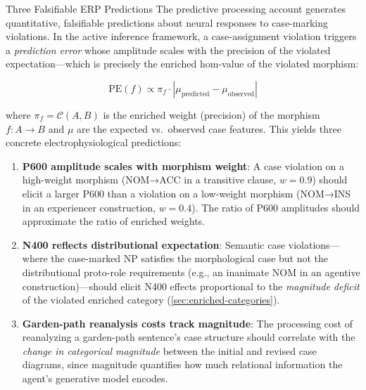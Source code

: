 \documentclass[
  ignorenonframetext,
]{beamer}
\begin{document}
\begin{frame}{Three Falsifiable ERP Predictions}
\protect{}\label{three-falsifiable-erp-predictions}
The predictive processing account generates quantitative, falsifiable
predictions about neural responses to case-marking violations. In the
active inference framework, a case-assignment violation triggers a
\emph{prediction error} whose amplitude scales with the precision of the
violated expectation---which is precisely the enriched hom-value of the
violated morphism:

\begin{equation}
\text{PE}(f) \propto \pi_f \cdot |\mu_{\text{predicted}} - \mu_{\text{observed}}|
\label{eq:pe-precision-error}
\end{equation}

where \(\pi_f = \mathcal{C}(A,B)\) is the enriched weight (precision) of
the morphism \(f: A \to B\) and \(\mu\) are the expected vs.~observed
case features. This yields three concrete electrophysiological
predictions:

\begin{enumerate}
\item
  \textbf{P600 amplitude scales with morphism weight}: A case violation
  on a high-weight morphism (NOM→ACC in a transitive clause,
  \(w = 0.9\)) should elicit a larger P600 than a violation on a
  low-weight morphism (NOM→INS in an experiencer construction,
  \(w = 0.4\)). The ratio of P600 amplitudes should approximate the
  ratio of enriched weights.
\item
  \textbf{N400 reflects distributional expectation}: Semantic case
  violations---where the case-marked NP satisfies the morphological case
  but not the distributional proto-role requirements (e.g., an inanimate
  NOM in an agentive construction)---should elicit N400 effects
  proportional to the \emph{magnitude deficit} of the violated enriched
  category (\autoref{sec:enriched-categories}).
\item
  \textbf{Garden-path reanalysis costs track magnitude}: The processing
  cost of reanalyzing a garden-path sentence's case structure should
  correlate with the \emph{change in categorical magnitude} between the
  initial and revised case diagrams, since magnitude quantifies how much
  relational information the agent's generative model encodes.
\end{enumerate}
\end{frame}
\end{document}
